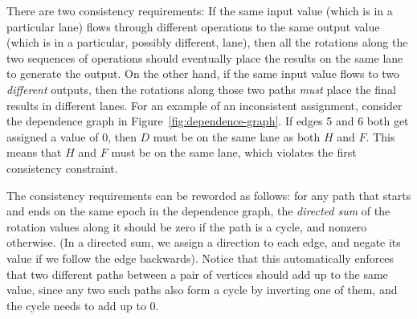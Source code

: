 There are two consistency requirements: If the same input value (which is in a particular lane) flows through different operations to the same output value (which is in a particular, possibly different, lane), then all the rotations along the two sequences of operations should eventually place the results on the same lane to generate the output. On the other hand, if the same input value flows to two {\em different} outputs, then the rotations along those two paths {\em must} place the final results in different lanes.  
For an example of an inconsistent assignment, consider the dependence graph in Figure~\ref{fig:dependence-graph}.
If edges 5 and 6 both get assigned a value of 0, then $D$ must be on the same lane as both $H$ and $F$.
This means that $H$ and $F$ must be on the same lane, which violates the first consistency constraint.

The consistency requirements can be reworded as follows: for any path that starts and ends on the same epoch in the dependence graph, the {\em directed sum} of the rotation values along it should be zero if the path is a cycle, and nonzero otherwise.
(In a directed sum, we assign a direction to each edge, and negate its value if we follow the edge backwards).
Notice that this automatically enforces that two different paths between a pair of vertices should add up to the same value, since any two such paths also form a cycle by inverting one of them, and the cycle needs to add up to 0. 


